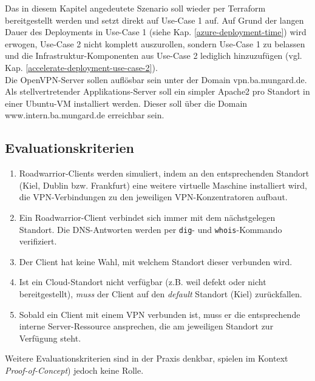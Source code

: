 Das in diesem Kapitel angedeutete Szenario soll wieder per Terraform bereitgestellt werden und setzt direkt auf Use-Case 1 auf. Auf Grund der langen Dauer des \gls{Deployment}s in Use-Case 1 (siehe Kap. \ref{azure-deployment-time}) wird erwogen, Use-Case 2 nicht \glqq komplett\grqq{} auszurollen, sondern Use-Case 1 zu belassen und die Infrastruktur-Komponenten aus Use-Case 2 lediglich hinzuzufügen (vgl. Kap. \ref{accelerate-deployment-use-case-2}).\\
Die OpenVPN-Server sollen auflösbar sein unter der Domain vpn.ba.mungard.de.\\
Als stellvertretender \glqq Applikations-Server\grqq{} soll ein simpler Apache2 pro Standort in einer Ubuntu-VM installiert werden. Dieser soll über die Domain www.intern.ba.mungard.de erreichbar sein.
\subsection{Evaluationskriterien}\label{eval-roadwarrior}
\begin{enumerate}
\item Roadwarrior-Clients werden simuliert, indem an den entsprechenden Standort (Kiel, Dublin bzw. Frankfurt) eine weitere virtuelle Maschine installiert wird, die VPN-Verbindungen zu den jeweiligen VPN-Konzentratoren aufbaut.
\item Ein Roadwarrior-Client verbindet sich immer mit dem nächstgelegen Standort. Die DNS-Antworten werden per \texttt{dig}- und \texttt{whois}-Kommando verifiziert.
\item Der Client hat keine Wahl, mit welchem Standort dieser verbunden wird.
\item Ist ein Cloud-Standort nicht verfügbar (z.B. weil defekt oder nicht bereitgestellt), \textit{muss} der Client auf den \textit{default} Standort (Kiel) zurückfallen.
\item Sobald ein Client mit einem VPN verbunden ist, muss er die entsprechende interne Server-Ressource ansprechen, die am jeweiligen Standort zur Verfügung steht.
\end{enumerate}

Weitere Evaluationskriterien sind in der Praxis denkbar, spielen im Kontext \textit{Proof-of-Concept}) jedoch keine Rolle.